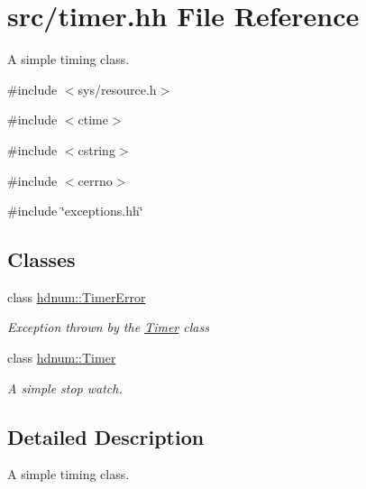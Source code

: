 \hypertarget{timer_8hh}{
\section{src/timer.hh File Reference}
\label{timer_8hh}
}


A simple timing class.  


{\ttfamily \#include $<$sys/resource.h$>$}\par
{\ttfamily \#include $<$ctime$>$}\par
{\ttfamily \#include $<$cstring$>$}\par
{\ttfamily \#include $<$cerrno$>$}\par
{\ttfamily \#include \char`\"{}exceptions.hh\char`\"{}}\par
\subsection*{Classes}
\begin{DoxyCompactItemize}
\item 
class \hyperlink{classhdnum_1_1TimerError}{hdnum::TimerError}
\begin{DoxyCompactList}\small\item\em Exception thrown by the \hyperlink{classhdnum_1_1Timer}{Timer} class \item\end{DoxyCompactList}\item 
class \hyperlink{classhdnum_1_1Timer}{hdnum::Timer}
\begin{DoxyCompactList}\small\item\em A simple stop watch. \item\end{DoxyCompactList}\end{DoxyCompactItemize}


\subsection{Detailed Description}
A simple timing class. 